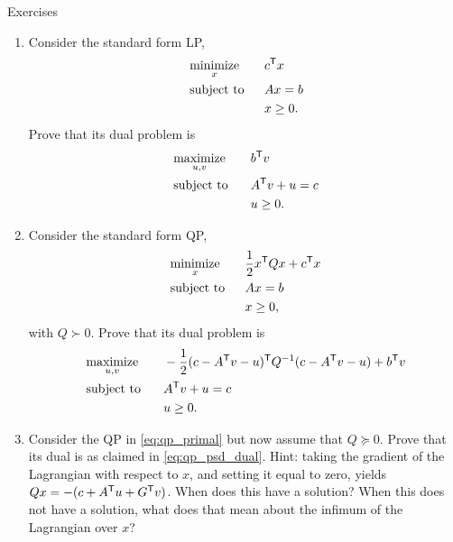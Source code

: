 \begin{xcb}{Exercises}
\begin{enumerate}[label=\thechapter.\arabic*]
\settowidth{\leftmargini}{0.00.\hskip\labelsep}
\item \label{ex:lp_std_dual}
  Consider the standard form LP,
  \begin{alignat*}{2}
  &\operatorname*{minimize}_x \quad && c^{\mathsf{T}} x \\
  &\operatorname{subject\,\,to} && Ax = b \\
  & && x \geq 0.
  \end{alignat*}
  Prove that its dual problem is 
  \begin{alignat*}{2}
  &\operatorname*{maximize}_{u,v} \quad && b^{\mathsf{T}} v \\
  &\operatorname{subject\,\,to} && A^{\mathsf{T}} v + u = c \\
  & && u \geq 0.
  \end{alignat*}

\item \label{ex:qp_std_dual} 
  Consider the standard form QP,
  \begin{alignat*}{2}
  &\operatorname*{minimize}_x \quad && \frac{1}{2} x^{\mathsf{T}} Q x + c^{\mathsf{T}} x \\
  &\operatorname{subject\,\,to} && Ax = b \\
  & && x \geq 0,
  \end{alignat*}
  with $Q \succ 0$. Prove that its dual problem is
  \begin{alignat*}{2}
  &\operatorname*{maximize}_{u,v} \quad && -\frac{1}{2} (c - A^{\mathsf{T}} v - u)^{\mathsf{T}} Q^{-1} (c - A^{\mathsf{T}} v
  - u) + b^{\mathsf{T}} v \\
  &\operatorname{subject\,\,to} && A^{\mathsf{T}} v + u = c \\
  & && u \geq 0.
  \end{alignat*}

\item \label{ex:qp_psd_dual} 
  Consider the QP in \eqref{eq:qp_primal} but now assume that $Q \succeq
  0$. Prove that its dual is as claimed in \eqref{eq:qp_psd_dual}. Hint: taking
  the gradient of the Lagrangian with respect to $x$, and setting it equal to
  zero, yields $Qx = -(c + A^{\mathsf{T}} u + G^{\mathsf{T}} v)$. When does this have a solution?
  When this does not have a solution, what does that mean about the infimum of 
  the Lagrangian over $x$?   


\end{enumerate}
\end{xcb}
